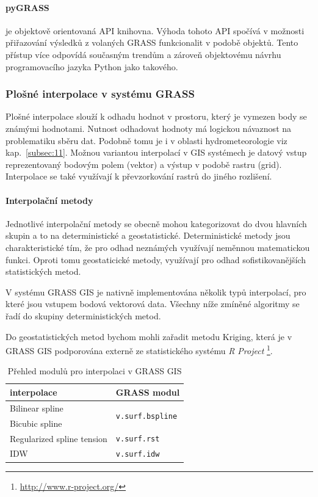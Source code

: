 \documentclass[a4paper,12pt,oneside]{report}
\begin{document}
\paragraph*{pyGRASS} je objektově orientovaná API knihovna. Výhoda
tohoto API spočívá v možnosti přiřazování výsledků z volaných GRASS
funkcionalit v podobě objektů. Tento přístup více odpovídá současným trendům a zároveň objektovému návrhu programovacího jazyka Python jako takového.

\subsubsection*{Plošné interpolace v systému GRASS }
\label{sec:plostneinterpolace}
Plošné interpolace slouží k odhadu hodnot v prostoru, který je vymezen 
body se známými hodnotami. Nutnost odhadovat hodnoty má logickou návaznost na
problematiku sběru dat.  Podobně tomu je i v oblasti
hydrometeorologie viz kap.~\ref{subsec:11}.
 Možnou variantou interpolací v GIS
systémech je datový vstup reprezentovaný bodovým polem (vektor) a
výstup v podobě rastru (grid). Interpolace se také využívají k
převzorkování rastrů do jiného rozlišení.

\paragraph*{ Interpolační metody}
Jednotlivé interpolační metody se obecně mohou kategorizovat do dvou
hlavních skupin a to na deterministické a geostatistické.
Deterministické metody jsou charakteristické tím, že pro odhad
neznámých využívají neměnnou matematickou funkci.  Oproti tomu
geostaticické metody, využívají pro odhad sofistikovanějších statistických metod.

V systému GRASS GIS je nativně implementována několik typů
interpolací, pro které jsou vstupem bodová vektorová data. Všechny
níže zmíněné algoritmy se řadí do skupiny deterministických metod.

Do geostatistických metod bychom mohli zařadit metodu Kriging, která
je v GRASS GIS podporována externě ze statistického systému \textit{R
  Project} \footnote{\url{http://www.r-project.org/}}.

\begin{table}[h]
\centering
\begin{tabular}{|ll|}
\hline
interpolace & GRASS modul \\ \hline\hline
Bilinear spline & \multirow{2}{*}{{\tt v.surf.bspline}} \\
Bicubic spline &  \\
Regularized spline tension & {\tt v.surf.rst} \\
IDW & {\tt v.surf.idw} \\ \hline
\end{tabular}
\caption{Přehled modulů pro interpolaci v GRASS GIS}
\label{my-label}
\end{table}
\end{document}
